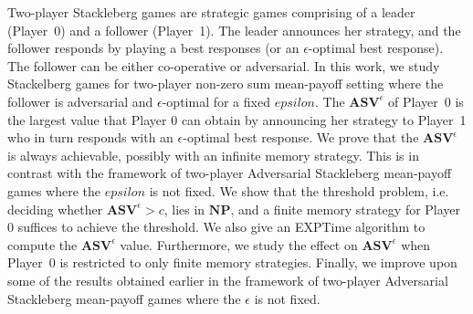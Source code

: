Two-player Stackleberg games are strategic games comprising of a leader (Player~0) and a follower (Player~1). The leader announces her strategy, and the follower responds by playing a best responses (or an $\epsilon$-optimal best response). The follower can be either co-operative or adversarial. In this work, we study Stackelberg games for two-player non-zero sum mean-payoff setting where the follower is adversarial and $\epsilon$-optimal for a fixed $epsilon$.
The $\mathbf{ASV}^{\epsilon}$ of Player~0 is the largest value that Player 0 can obtain by announcing her strategy to Player~1 who in turn responds with an $\epsilon$-optimal best response. 
We prove that the $\mathbf{ASV}^{\epsilon}$ is always achievable, possibly with an infinite memory strategy.
This is in contrast with the framework of two-player Adversarial Stackleberg mean-payoff games where the $epsilon$ is not fixed.
We show that the threshold problem, i.e. deciding whether $\mathbf{ASV}^{\epsilon} > c$, lies in $\textbf{NP}$, and a finite memory strategy for Player 0 suffices to achieve the threshold.
We also give an {\sf EXPTime} algorithm to compute the $\mathbf{ASV}^{\epsilon}$ value.
Furthermore, we study the effect on $\mathbf{ASV}^{\epsilon}$ when Player~0 is restricted to only finite memory strategies.
Finally, we improve upon some of the results obtained earlier in the framework of two-player Adversarial Stackleberg mean-payoff games where the $\epsilon$ is not fixed.